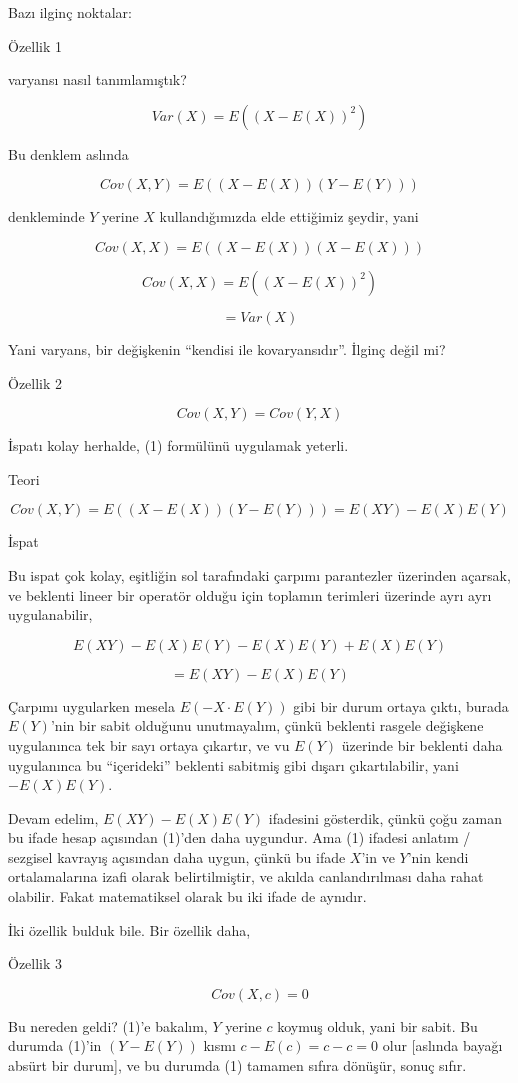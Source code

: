 \documentclass[12pt,fleqn]{article}\usepackage{../../common}
\begin{document}
Bazı ilginç noktalar:

Özellik 1

varyansı nasıl tanımlamıştık? 

$$ Var(X) = E( (X-E(X))^2 )  $$

Bu denklem aslında 

$$ Cov(X,Y) = E( (X-E(X))(Y-E(Y)) )  $$

denkleminde $Y$ yerine $X$ kullandığımızda elde ettiğimiz şeydir, yani

$$ Cov(X,X) = E((X-E(X))(X-E(X)))  $$

$$ Cov(X,X) = E((X-E(X))^2)   $$

$$ = Var(X) $$

Yani varyans, bir değişkenin ``kendisi ile kovaryansıdır''. İlginç değil
mi? 

Özellik 2

$$ Cov(X,Y) = Cov(Y,X) $$

İspatı kolay herhalde, (1) formülünü uygulamak yeterli.

Teori

$$ Cov(X,Y) = E((X-E(X))(Y-E(Y))) = E(XY) - E(X)E(Y)$$

İspat

Bu ispat çok kolay, eşitliğin sol tarafındaki çarpımı parantezler üzerinden
açarsak, ve beklenti lineer bir operatör olduğu için toplamın terimleri
üzerinde ayrı ayrı uygulanabilir, 

$$ E(XY) -E(X)E(Y) -E(X)E(Y) + E(X)E(Y) $$

$$  =  E(XY) - E(X)E(Y) $$

Çarpımı uygularken mesela $E(-X \cdot E(Y))$ gibi bir durum ortaya çıktı,
burada $E(Y)$'nin bir sabit olduğunu unutmayalım, çünkü beklenti rasgele
değişkene uygulanınca tek bir sayı ortaya çıkartır, ve vu $E(Y)$ üzerinde
bir beklenti daha uygulanınca bu ``içerideki'' beklenti sabitmiş gibi
dışarı çıkartılabilir, yani $-E(X)E(Y)$. 

Devam edelim, $E(XY) - E(X)E(Y)$ ifadesini gösterdik, çünkü çoğu zaman bu
ifade hesap açısından (1)'den daha uygundur. Ama (1) ifadesi anlatım /
sezgisel kavrayış açısından daha uygun, çünkü bu ifade $X$'in ve $Y$'nin
kendi ortalamalarına izafi olarak belirtilmiştir, ve akılda canlandırılması
daha rahat olabilir. Fakat matematiksel olarak bu iki ifade de aynıdır. 

İki özellik bulduk bile. Bir özellik daha,

Özellik 3

$$ Cov(X,c) = 0 $$

Bu nereden geldi? (1)'e bakalım, $Y$ yerine $c$ koymuş olduk, yani bir
sabit. Bu durumda (1)'in $(Y-E(Y))$ kısmı $c-E(c)=c-c=0$ olur [aslında
bayağı absürt bir durum], ve bu durumda (1) tamamen sıfıra dönüşür, sonuç sıfır.
\end{document}
